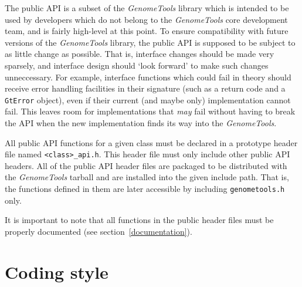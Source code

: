 \documentclass[11pt,final]{article}
\newcommand{\keyword}[1]{\lstinline{#1}}
\newcommand{\Gt}[0]{\emph{GenomeTools}\xspace}
\begin{document}
The public API is a subset of the \Gt library which is intended to be used by
developers which do not belong to the \Gt core development team, and is fairly
high-level at this point. To ensure compatibility with future versions of the
\Gt library, the public API is supposed to be subject to as little change as
possible. That is, interface changes should be made very sparsely, and interface
design should `look forward' to make such changes unneccessary. For example,
interface functions which could fail in theory should receive error handling
facilities in their signature (such as a return code and a \keyword{GtError}
object), even if their current (and maybe only) implementation cannot fail. This
leaves room for implementations that \emph{may} fail without having to break the
API when the new implementation finds its way into the \Gt .

All public API functions for a given class must be declared in a prototype
header file named \keyword{<class>_api.h}. This header file must only include
other public API headers. All of the public API header files are packaged to be
distributed with the \Gt tarball and are installed into the given include path.
That is, the functions defined in them are later accessible by including
\keyword{genometools.h} only.

It is important to note that all functions in the public header files must be
properly documented (see section~\ref{documentation}).

\section{Coding style}
\end{document}
